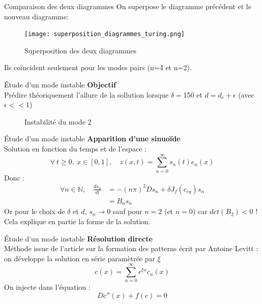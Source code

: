 \documentclass{beamer}
\begin{document}
\begin{frame}{Comparaison des deux diagrammes}
On superpose le diagramme précédent et le nouveau diagramme:
\begin{figure}
\texttt{[image: superposition\_diagrammes\_turing.png]}
\caption{Superposition des deux diagrammes}
\end{figure}
Ils coïncident seulement pour les modes pairs (n=4 et n=2).
\end{frame}






\begin{frame}{\'Etude d'un mode instable}
\textbf{Objectif}\\
Prédire théoriquement l'allure de la sollution lorsque $\delta=$150 et $d=d_c +\epsilon$ (avec $\epsilon<<1$)
\begin{figure}
\begin{subfigure}
\texttt{[image: diagrammes\_turing1.png]}
\end{subfigure}
\begin{subfigure}
\texttt{[image: graph1.png]}
\end{subfigure}
\caption{\label{fig:graph1}Instabilité du mode 2}
\end{figure}
\end{frame}

\begin{frame}{\'Etude d'un mode instable}
\textbf{Apparition d'une sinuoïde}\\
Solution en fonction du temps et de l'espace :
\begin{equation}
    \forall \  t\geq 0 ,\ x \in [0,1], \quad  z(x,t) = \sum_{n=0}^{\infty} s_{n}(t)e_{n}(x)
\end{equation}
Donc : 
\begin{equation}
\begin{split}
    \forall n \in \mathbb{N}, \quad \frac{d s_{n}}{dt} & = -(n \pi)^{2}D s_{n} + \delta J_{f}(c_{eq}) s_{n} \\
    & = B_{n} s_{n}
\end{split}
\end{equation}
Or pour le choix de $\delta$ et $d$, $s_n \longrightarrow 0$ sauf pour $n=2$ (et $n=0$) car $det(B_2)<0$ ! Cela explique en partie la forme de la solution.
\end{frame}

\begin{frame}{\'Etude d'un mode instable}
\textbf{Résolution directe}\\
Méthode issue de l'article sur la formation des patterns écrit par Antoine Levitt : on développe la solution en série paramètrée par $\xi$
\begin{equation}
c(x) = \sum_{n=0}^{\infty} \epsilon^{\xi n} c_n (x)
\end{equation}
On injecte dans l'équation : 
\begin{equation}
Dc''(x) + f(c)=0
\end{equation}
\end{frame}
\end{document}
